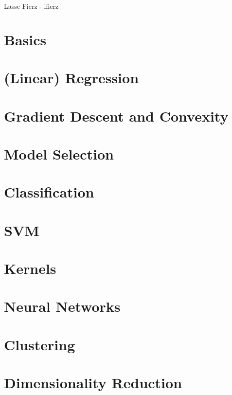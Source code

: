 


    \begin{multicols*}{4}

        {Lasse Fierz - lfierz}
        
            \section{Basics}
            
            \section{(Linear) Regression}
            
            \section{Gradient Descent and Convexity}
            
            \section{Model Selection}
            
            \section{Classification}
            
            \section{SVM}
            
            \section{Kernels}
            
            \section{Neural Networks}
            
            \section{Clustering}
            
            \section{Dimensionality Reduction}
            

\end{multicols*}
